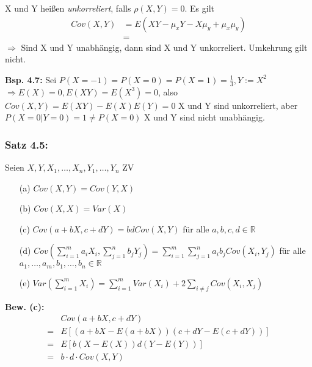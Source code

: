 \documentclass[a4paper,11pt]{article}
\begin{document}
\vspace{6pt}
\noindent X und Y heißen \textit{unkorreliert}, falls $\rho(X,Y)=0$.
\newline Es gilt 
\begin{align*}
Cov(X,Y) &= E(XY-\mu_xY-X\mu_y+\mu_x\mu_y)\\
&= 
\end{align*}
$\Rightarrow$ Sind X und Y unabhängig, dann sind X und Y unkorreliert. Umkehrung gilt nicht.

\vspace{6pt}
\noindent\textbf{Bsp. 4.7:} Sei $P(X=-1)=P(X=0)=P(X=1)=\frac{1}{3}, Y:=X^2$
\newline $\Rightarrow E(X)=0,E(XY)=E(X^3)=0$, also
\newline $Cov(X,Y)=E(XY)-E(X)E(Y)=0$
\newline X und Y sind unkorreliert, aber
\newline $P(X=0|Y=0)=1 \neq P(X=0)$
\newline X und Y sind nicht unabhängig.

\subsubsection{Satz 4.5:} Seien $X,Y,X_1,\dots,X_n,Y_1,\dots,Y_n$ ZV
\begin{itemize}
\item[(a)] $Cov(X,Y) = Cov(Y,X)$
\item[(b)] $Cov(X,X) = Var(X)$
\item[(c)] $Cov(a+bX,c+dY) = bdCov(X,Y)$ für alle $a,b,c,d\in\mathbb{R}$
\item[(d)] $Cov(\sum_{i=1}^{m}a_iX_i,\sum_{j=1}^{n}b_jY_j) = \sum_{i=1}^{m}\sum_{j=1}^{n}a_ib_jCov(X_i,Y_j)$ für alle $a_1,\dots,a_m,b_1,\dots,b_n\in\mathbb{R}$
\item[(e)] $Var(\sum_{i=1}^{m}X_i)=\sum_{i=1}^{m}Var(X_i)+2\sum_{i\neq j}Cov(X_i,X_j)$
\end{itemize} 

\noindent\textbf{Bew. (c):}
\begin{align*}
& Cov(a+bX,c+dY)\\
=&E[(a+bX-E(a+bX))(c+dY-E(c+dY))]\\
=&E[b(X-E(X))d(Y-E(Y))]\\
=&b\cdot d\cdot Cov(X,Y)\\
\end{align*}
\end{document}
